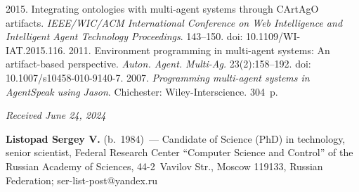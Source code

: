 \begin{multicols}{2}
{{\begin{thebibliography}{99}
2015. Integrating ontologies with multi-agent systems through CArtAgO artifacts. 
\textit{IEEE/WIC/ACM International Conference on Web Intelligence and Intelligent Agent 
Technology Proceedings}. 143--150. doi: 10.1109/WI-IAT.2015.116.
    2011. Environment programming in multi-agent 
systems: An artifact-based perspective. \textit{Auton. Agent. Multi-Ag.} 23(2):158--192. doi: 
10.1007/s10458-010-9140-7.
    2007. \textit{Programming  
multi-agent systems in AgentSpeak using Jason}. Chichester: Wiley-Interscience. 304~p.
   
   
  \end{thebibliography}

 }
 }

\end{multicols}

\vspace*{-6pt}

\hfill{\small\textit{Received June 24, 2024}} 

\vspace*{-18pt}


\Contrl

\vspace*{-3pt}
   
   \noindent
   \textbf{Listopad Sergey V.} (b.\ 1984)~--- Candidate of Science (PhD) in technology, senior 
scientist, Federal Research Center ``Computer Science and Control'' of the Russian Academy of 
Sciences, 44-2~Vavilov Str., Moscow 119133, Russian Federation;  
\mbox{ser-list-post@yandex.ru}
   
   
\label{end\stat}

\renewcommand{\bibname}{\protect\rm Литература} 